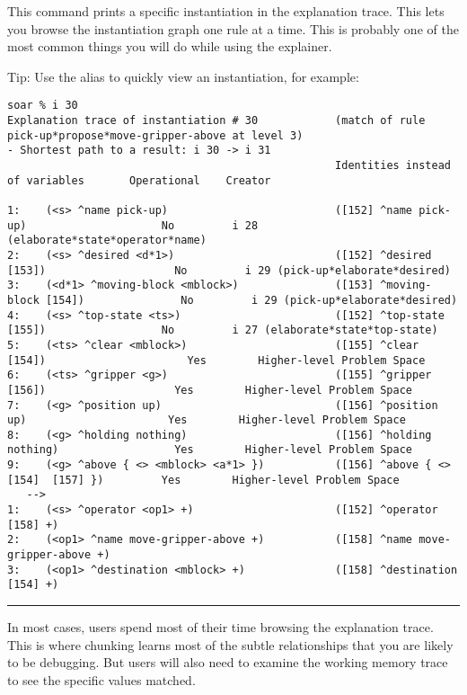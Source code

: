 This command prints a specific instantiation in the explanation trace.  This lets you browse the instantiation graph one rule at a time. This is probably one of the most common things you will do while using the explainer. 

Tip: Use the alias  to quickly view an instantiation, for example:

{\tiny
\begin{verbatim}
soar % i 30
Explanation trace of instantiation # 30            (match of rule pick-up*propose*move-gripper-above at level 3)
- Shortest path to a result: i 30 -> i 31
                                                   Identities instead of variables       Operational    Creator

1:    (<s> ^name pick-up)                          ([152] ^name pick-up)                     No         i 28 (elaborate*state*operator*name)
2:    (<s> ^desired <d*1>)                         ([152] ^desired [153])                    No         i 29 (pick-up*elaborate*desired)
3:    (<d*1> ^moving-block <mblock>)               ([153] ^moving-block [154])               No         i 29 (pick-up*elaborate*desired)
4:    (<s> ^top-state <ts>)                        ([152] ^top-state [155])                  No         i 27 (elaborate*state*top-state)
5:    (<ts> ^clear <mblock>)                       ([155] ^clear [154])                      Yes        Higher-level Problem Space
6:    (<ts> ^gripper <g>)                          ([155] ^gripper [156])                    Yes        Higher-level Problem Space
7:    (<g> ^position up)                           ([156] ^position up)                      Yes        Higher-level Problem Space
8:    (<g> ^holding nothing)                       ([156] ^holding nothing)                  Yes        Higher-level Problem Space
9:    (<g> ^above { <> <mblock> <a*1> })           ([156] ^above { <>[154]  [157] })         Yes        Higher-level Problem Space
   -->
1:    (<s> ^operator <op1> +)                      ([152] ^operator [158] +)
2:    (<op1> ^name move-gripper-above +)           ([158] ^name move-gripper-above +)
3:    (<op1> ^destination <mblock> +)              ([158] ^destination [154] +)
\end{verbatim}
}

\rule{\textwidth}{1pt}

\textbf{}

In most cases, users spend most of their time browsing the explanation
trace. This is where chunking learns most of the subtle relationships
that you are likely to be debugging. But users will also need to examine
the working memory trace to see the specific values matched.


